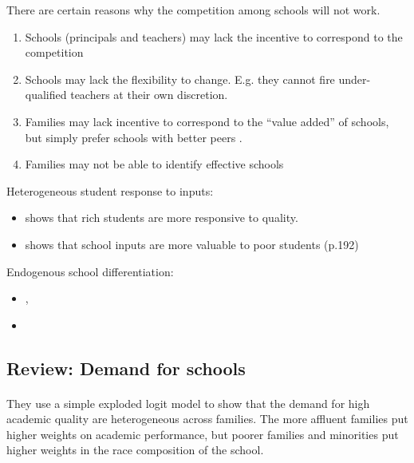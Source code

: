 There are certain reasons why the competition among schools will not work.
\begin{enumerate}
    \item Schools (principals and teachers) may lack the incentive to correspond to the competition
    \item Schools may lack the flexibility to change. E.g. they cannot fire under-qualified teachers at their own discretion.
    \item Families may lack incentive to correspond to the ``value added'' of schools, but simply prefer schools with better peers \parencite{AbdulkadirogluPathakSchellenberg2017,MacLeodUrquiola2015,MacLeodUrquiola2019}.
    \item Families may not be able to identify effective schools \parencite{AllendeGallegoNeilson2018}
\end{enumerate}


Heterogeneous student response to inputs:
\begin{itemize}
    \item \textcite{Bau2019} shows that rich students are more responsive to quality.
    \item \textcite{JacksonJohnsonPersico2016} shows that school inputs are more valuable to poor students (p.192)
\end{itemize}


Endogenous school differentiation:
\begin{itemize}
    \item \textcite{MacLeodUrquiola2012}, \textcite{GilrainePetronijevicSingleton2019}
    \item \citet{Neilson2018}
\end{itemize}



\subsection*{Review: Demand for schools}

\paragraph{\citet{HastingsKaneStaiger2009}}
They use a simple exploded logit model to show that the demand for high academic quality are heterogeneous across families.
The more affluent families put higher weights on academic performance, but poorer families and minorities put higher weights in the race composition of the school.

